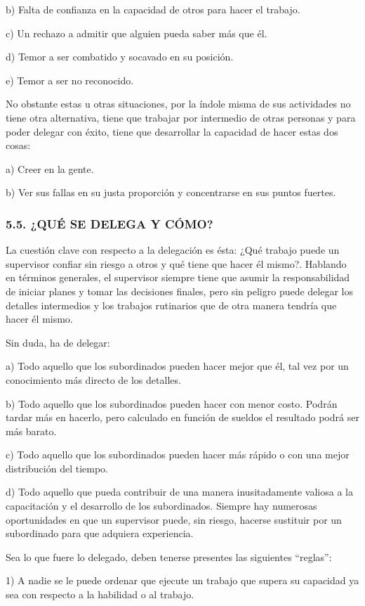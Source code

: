 b) Falta de confianza en la capacidad de otros para hacer el trabajo.

c) Un rechazo a admitir que alguien pueda saber más que él.

d) Temor a ser combatido y socavado en su posición.

e) Temor a ser no reconocido.

No obstante estas u otras situaciones, por la índole misma de sus actividades no tiene otra alternativa, tiene que trabajar por intermedio de otras personas y para poder delegar con éxito, tiene que desarrollar la capacidad de hacer estas dos cosas:

a) Creer en la gente.

b) Ver sus fallas en su justa proporción y concentrarse en sus puntos fuertes.

\subsubsection*{5.5. ¿QUÉ SE DELEGA Y CÓMO?}
La cuestión clave con respecto a la delegación es ésta: ¿Qué trabajo puede un supervisor confiar sin riesgo a otros y qué tiene que hacer él mismo?. Hablando en términos generales, el supervisor siempre tiene que asumir la responsabilidad de iniciar planes y tomar las decisiones finales, pero sin peligro puede delegar los detalles intermedios y los trabajos rutinarios que de otra manera tendría que hacer él mismo.

Sin duda, ha de delegar:

a) Todo aquello que los subordinados pueden hacer mejor que él, tal vez por un conocimiento más directo de los detalles.



b) Todo aquello que los subordinados pueden hacer con menor costo. Podrán tardar más en hacerlo, pero calculado en función de sueldos el resultado podrá ser más barato.

c) Todo aquello que los subordinados pueden hacer más rápido o con una mejor distribución del tiempo.

d) Todo aquello que pueda contribuir de una manera inusitadamente valiosa a la capacitación y el desarrollo de los subordinados. Siempre hay numerosas oportunidades en que un supervisor puede, sin riesgo, hacerse sustituir por un subordinado para que adquiera experiencia.

Sea lo que fuere lo delegado, deben tenerse presentes las siguientes “reglas”:

1) A nadie se le puede ordenar que ejecute un trabajo que supera su capacidad ya sea con respecto a la habilidad o al trabajo.

